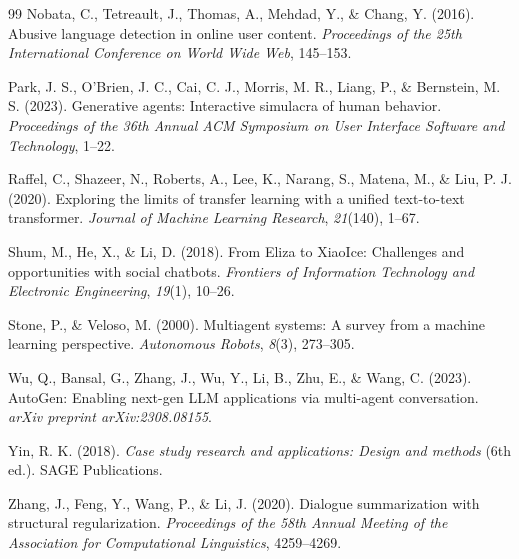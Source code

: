\documentclass[11pt,letterpaper]{article}
\begin{document}
\begin{thebibliography}{99}
Nobata, C., Tetreault, J., Thomas, A., Mehdad, Y., \& Chang, Y. (2016). Abusive language detection in online user content. \textit{Proceedings of the 25th International Conference on World Wide Web}, 145--153.

Park, J. S., O'Brien, J. C., Cai, C. J., Morris, M. R., Liang, P., \& Bernstein, M. S. (2023). Generative agents: Interactive simulacra of human behavior. \textit{Proceedings of the 36th Annual ACM Symposium on User Interface Software and Technology}, 1--22.

Raffel, C., Shazeer, N., Roberts, A., Lee, K., Narang, S., Matena, M., \& Liu, P. J. (2020). Exploring the limits of transfer learning with a unified text-to-text transformer. \textit{Journal of Machine Learning Research}, \textit{21}(140), 1--67.

Shum, M., He, X., \& Li, D. (2018). From Eliza to XiaoIce: Challenges and opportunities with social chatbots. \textit{Frontiers of Information Technology and Electronic Engineering}, \textit{19}(1), 10--26.

Stone, P., \& Veloso, M. (2000). Multiagent systems: A survey from a machine learning perspective. \textit{Autonomous Robots}, \textit{8}(3), 273--305.

Wu, Q., Bansal, G., Zhang, J., Wu, Y., Li, B., Zhu, E., \& Wang, C. (2023). AutoGen: Enabling next-gen LLM applications via multi-agent conversation. \textit{arXiv preprint arXiv:2308.08155}.

Yin, R. K. (2018). \textit{Case study research and applications: Design and methods} (6th ed.). SAGE Publications.

Zhang, J., Feng, Y., Wang, P., \& Li, J. (2020). Dialogue summarization with structural regularization. \textit{Proceedings of the 58th Annual Meeting of the Association for Computational Linguistics}, 4259--4269.

\end{thebibliography}
\end{document}
